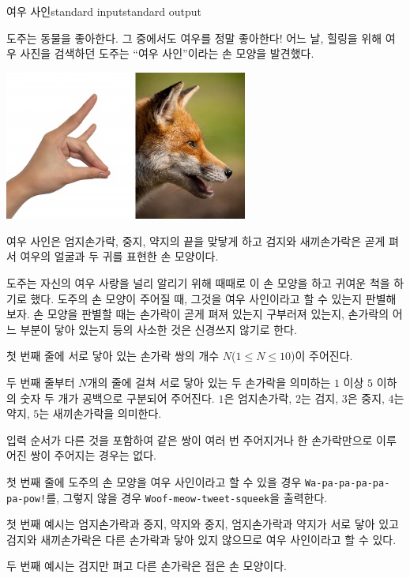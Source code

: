 \begin{problem}{여우 사인}{standard input}{standard output}

도주는 동물을 좋아한다. 그 중에서도 여우를 정말 좋아한다! 어느 날, 힐링을 위해 여우 사진을 검색하던 도주는 ``여우 사인''이라는 손 모양을 발견했다.

\begin{center}
  \includegraphics[width=0.6\textwidth]{fox-sign.png}
\end{center}

여우 사인은 엄지손가락, 중지, 약지의 끝을 맞닿게 하고 검지와 새끼손가락은 곧게 펴서 여우의 얼굴과 두 귀를 표현한 손 모양이다.

도주는 자신의 여우 사랑을 널리 알리기 위해 때때로 이 손 모양을 하고 귀여운 척을 하기로 했다. 도주의 손 모양이 주어질 때, 그것을 여우 사인이라고 할 수 있는지 판별해 보자. 손 모양을 판별할 때는 손가락이 곧게 펴져 있는지 구부러져 있는지, 손가락의 어느 부분이 닿아 있는지 등의 사소한 것은 신경쓰지 않기로 한다.

\InputFile
첫 번째 줄에 서로 닿아 있는 손가락 쌍의 개수 $N$($1 \le N \le 10$)이 주어진다.

두 번째 줄부터 $N$개의 줄에 걸쳐 서로 닿아 있는 두 손가락을 의미하는 $1$ 이상 $5$ 이하의 숫자 두 개가 공백으로 구분되어 주어진다. $1$은 엄지손가락, $2$는 검지, $3$은 중지, $4$는 약지, $5$는 새끼손가락을 의미한다.

입력 순서가 다른 것을 포함하여 같은 쌍이 여러 번 주어지거나 한 손가락만으로 이루어진 쌍이 주어지는 경우는 없다.

\OutputFile
첫 번째 줄에 도주의 손 모양을 여우 사인이라고 할 수 있을 경우 \texttt{Wa-pa-pa-pa-pa-pa-pow!}를, 그렇지 않을 경우 \texttt{Woof-meow-tweet-squeek}을 출력한다.

\Example

\begin{example}
%
%
\end{example}

\Notes
첫 번째 예시는 엄지손가락과 중지, 약지와 중지, 엄지손가락과 약지가 서로 닿아 있고 검지와 새끼손가락은 다른 손가락과 닿아 있지 않으므로 여우 사인이라고 할 수 있다.

두 번째 예시는 검지만 펴고 다른 손가락은 접은 손 모양이다.

\end{problem}
